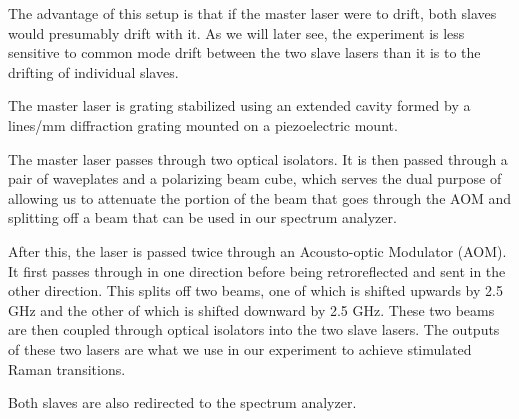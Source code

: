 The advantage of this setup is that if the master laser were to drift, both slaves would presumably drift with it. As we will later see, the experiment is less sensitive to common mode drift between the two slave lasers than it is to the drifting of individual slaves.

The master laser is grating stabilized using an extended cavity formed by a  %
lines/mm diffraction grating mounted on a piezoelectric mount. 

The master laser passes through two optical isolators. It is then passed through a pair of waveplates and a polarizing beam cube, which serves the dual purpose of allowing us to attenuate the portion of the beam that goes through the AOM and splitting off a beam that can be used in our spectrum analyzer. 

After this, the laser is passed twice through an Acousto-optic Modulator (AOM). It first passes through in one direction before being retroreflected and sent in the other direction. This splits off two beams, one of which is shifted upwards by 2.5 GHz and the other of which is shifted downward by 2.5 GHz. These two beams are then coupled through optical isolators into the two slave lasers. The outputs of these two lasers are what we use in our experiment to achieve stimulated Raman transitions. 

Both slaves are also redirected to the spectrum analyzer. 

